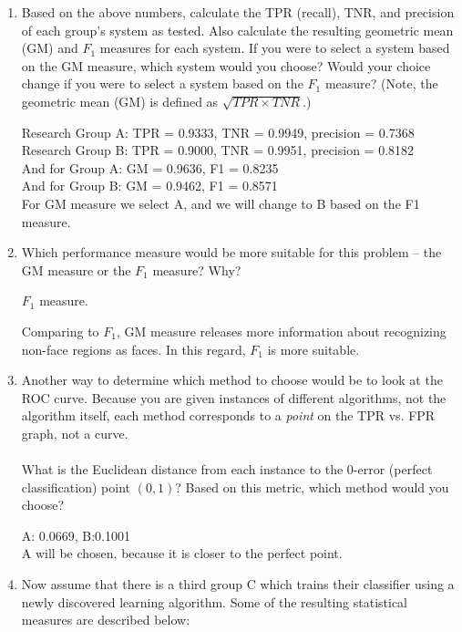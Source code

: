 \begin{enumerate}
\item 
Based on the above numbers, calculate the TPR (recall), TNR, and precision of each group's system as tested. 
Also calculate the resulting geometric mean (GM) and $F_1$ measures for each system.
If you were to select a system based on the GM measure, which system would you choose? Would your choice change if you were to select a system based on the $F_1$ measure? (Note, the geometric mean (GM) is defined as $\sqrt{TPR\times TNR}$.)

Research Group A:
    TPR = 0.9333, TNR = 0.9949, precision = 0.7368\\
Research Group B:
    TPR = 0.9000, TNR = 0.9951, precision = 0.8182\\
And for Group A: GM = 0.9636, F1 = 0.8235\\
And for Group B: GM = 0.9462, F1 = 0.8571\\
   
For GM measure we select A, and we will change to B based on the F1 measure.\\
    
\item 
Which performance measure would be more suitable for this problem -- the GM measure or the $F_1$ measure? Why?

$F_1$ measure. 

Comparing to $F_1$, GM measure releases more information about recognizing non-face regions as faces. In this regard, $F_1$ is more suitable.\\
    
\item  Another way to determine which method to choose would be to look at the ROC curve. Because you are given instances of different algorithms, not the algorithm itself, each method corresponds to a \textit{point} on the TPR vs. FPR graph, not a curve. \\ \ \\ What is the Euclidean distance from each instance to the 0-error (perfect classification) point $(0,1)$? Based on this metric, which method would you choose? 

A: 0.0669, B:0.1001\\
A will be chosen, because it is closer to the perfect point.

\item 
Now assume that there is a third group C which trains their classifier using a newly discovered learning algorithm. Some of the resulting statistical measures are described below:


\end{enumerate}
